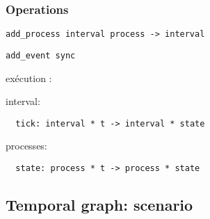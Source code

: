 \documentclass[applsci,article,submit,moreauthors,pdftex,10pt,a4paper]{mdpi}
\begin{document}
\subsubsection{Operations}

\begin{lstlisting}
add_process interval process -> interval
\end{lstlisting}

\begin{lstlisting}
add_event sync
\end{lstlisting}

exécution : 

interval: 
\begin{lstlisting}
  tick: interval * t -> interval * state
  \end{lstlisting}

processes:
\begin{lstlisting}
  state: process * t -> process * state
  \end{lstlisting}

\subsection{Temporal graph: scenario}
\end{document}
